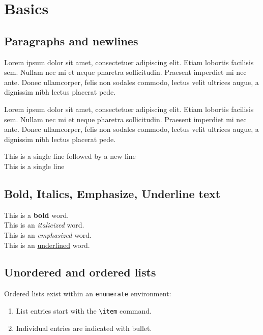 \newpage
\section{Basics}

\subsection{Paragraphs and newlines}

Lorem ipsum dolor sit amet, consectetuer adipiscing elit. Etiam lobortis facilisis sem. Nullam nec mi et neque pharetra sollicitudin. Praesent imperdiet mi nec ante. Donec ullamcorper, felis non sodales commodo, lectus velit ultrices augue, a dignissim nibh lectus placerat pede.\par
Lorem ipsum dolor sit amet, consectetuer adipiscing elit. Etiam lobortis facilisis sem. Nullam nec mi et neque pharetra sollicitudin. Praesent imperdiet mi nec ante. Donec ullamcorper, felis non sodales commodo, lectus velit ultrices augue, a dignissim nibh lectus placerat pede.
\par
\setlength{\parindent=0pt} %
This is a single line followed by a new line \\
This is a single line

\subsection{Bold, Italics, Emphasize, Underline text}

This is a \textbf{bold} word. \\
This is an \textit{italicized} word. \\
This is an \emph{emphasized} word. \\
This is an \underline{underlined} word.

\subsection{Unordered and ordered lists}

Ordered lists exist within an \verb|enumerate| environment:
\begin{enumerate}
  \item List entries start with the \verb|\item| command.
  \item Individual entries are indicated with bullet.
\end{enumerate}
\par

